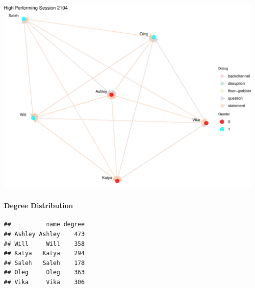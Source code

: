 \documentclass[
]{article}
\newenvironment{Shaded}{\begin{snugshade}}{\end{snugshade}}
\newcommand{\AttributeTok}[1]{\textcolor[rgb]{0.13,0.29,0.53}{#1}}
\newcommand{\ConstantTok}[1]{\textcolor[rgb]{0.56,0.35,0.01}{#1}}
\newcommand{\FunctionTok}[1]{\textcolor[rgb]{0.13,0.29,0.53}{\textbf{#1}}}
\newcommand{\NormalTok}[1]{#1}
\newcommand{\OtherTok}[1]{\textcolor[rgb]{0.56,0.35,0.01}{#1}}
\newcommand{\SpecialCharTok}[1]{\textcolor[rgb]{0.81,0.36,0.00}{\textbf{#1}}}
\newcommand{\StringTok}[1]{\textcolor[rgb]{0.31,0.60,0.02}{#1}}
\begin{document}
\begin{center}\includegraphics{april_files/figure-latex/unnamed-chunk-5-1} \end{center}

\hypertarget{degree-distribution}{%
\paragraph{Degree Distribution}\label{degree-distribution}}

\begin{Shaded}
\end{Shaded}

\begin{verbatim}
##          name degree
## Ashley Ashley    473
## Will     Will    358
## Katya   Katya    294
## Saleh   Saleh    178
## Oleg     Oleg    363
## Vika     Vika    306
\end{verbatim}
\end{document}
